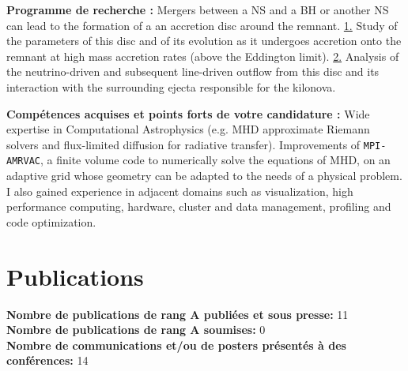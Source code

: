 \documentclass[11pt]{article}
\begin{document}
\vspace{-0.1cm}

{\bf Programme de recherche :}  
Mergers between a NS and a BH or another NS can lead to the formation of a an accretion disc around the remnant. \underline{1.} Study of the parameters of this disc and of its evolution as it undergoes accretion onto the remnant at high mass accretion rates (above the Eddington limit). \underline{2.} Analysis of the neutrino-driven and subsequent line-driven outflow from this disc and its interaction with the surrounding ejecta responsible for the kilonova.\\

\vspace{-0.1cm}

{\bf Comp\'etences acquises et points forts de votre candidature :}  
Wide expertise in Computational Astrophysics (e.g. MHD approximate Riemann solvers and flux-limited diffusion for radiative transfer). Improvements of \texttt{MPI-AMRVAC}, a finite volume code to numerically solve the equations of MHD, on an adaptive grid whose geometry can be adapted to the needs of a physical problem. I also gained experience in adjacent domains such as visualization, high performance computing, hardware, cluster and data management, profiling and code optimization.



\section*{Publications}
\vspace{0.3cm}

{\bf Nombre de publications de rang A publi\'ees et sous presse:} 11 \\
 
{\bf Nombre de publications de rang A soumises:} 0 \\

{\bf Nombre de communications et/ou de posters pr\'esent\'es \`a des
  conf\'erences:} 14 \\
  
\end{document}
